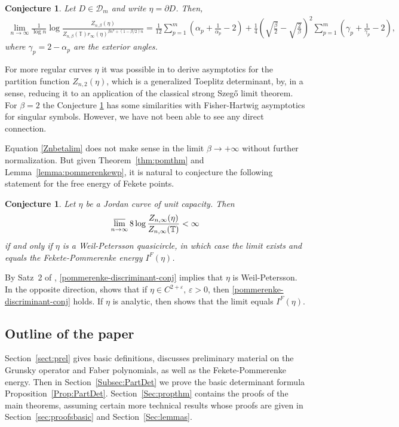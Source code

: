 \documentclass{article}
\numberwithin{equation}{section}
\numberwithin{figure}{section}
\theoremstyle{plain}
\theoremstyle{plain}
\numberwithin{thm}{section}
\newtheorem{conjecture}[thm]{Conjecture}
\theoremstyle{remark}
\newcommand{\T}{\mathbb{T}}
\let \epsilon \varepsilon
\begin{document}
\begin{conjecture}\label{Conj:Curvecorners}
Let $D \in \mathcal{D}_m$ and write $\eta = \partial D$. Then,
\begin{align}\label{Znbetaconj}
\lim_{n\to\infty}\frac 1{\log n}\log \frac{Z_{n,\beta}(\eta)}{Z_{n,\beta}(\T)r_\infty(\eta)^{\beta n^2+(1-\beta/2)n}}=\frac 1{12}\sum_{p=1}^m \left(\alpha_p+\frac 1{\alpha_p}-2 \right)+
\frac 14\left(\sqrt{\frac{\beta}{2}}-\sqrt{\frac{2}{\beta}}\right)^2\sum_{p=1}^m \left(\gamma_p+\frac 1{\gamma_p}-2 \right),
\end{align}
where  $\gamma_p  = 2-\alpha_p$ are the exterior angles.
\end{conjecture}
For more regular curves $\eta$ it was possible in \cite{Jo} to derive asymptotics for the partition function $Z_{n,2}(\eta)$, which is a generalized Toeplitz determinant, by, in a sense, reducing it to an application of the classical strong Szeg\H{o} limit theorem. For $\beta=2$ the Conjecture \ref{Conj:Curvecorners} has some
similarities with Fisher-Hartwig asymptotics for singular symbols. However, we have not been able to see any direct connection.

Equation \eqref{Znbetalim} does not make sense in the limit $\beta \to 
 +\infty$ without further normalization. But given Theorem~\ref{thm:pomthm} and Lemma~\ref{lemma:pommerenkewp}, it is natural to conjecture the following statement for the free energy of Fekete points.
\begin{conjecture}\label{Conj:discriminant}
Let $\eta$ be a Jordan curve of unit capacity. Then
\begin{align} \label{pommerenke-discriminant-conj}
\varlimsup_{n \to \infty} 8 \log \frac{Z_{n,\infty}(\eta)}{Z_{n,\infty}(\T)} < \infty
\end{align}
if and only if $\eta$ is a Weil-Petersson quasicircle, in which case the limit exists and equals the Fekete-Pommerenke energy $I^F(\eta)$. 
\end{conjecture}
 By Satz~2 of \cite{pom67}, \eqref{pommerenke-discriminant-conj} implies that $\eta$ is Weil-Petersson. In the opposite direction, \cite{pom65} shows that if  $\eta \in C^{2+\epsilon}, \, \epsilon >0$, then \eqref{pommerenke-discriminant-conj} holds. If $\eta$ is analytic, then \cite{pom69} shows that the limit equals $I^F(\eta)$. 




\subsection{Outline of the paper}
Section~\ref{sect:prel} gives basic definitions, discusses preliminary material on the Grunsky operator and Faber polynomials, as well as the Fekete-Pommerenke energy. Then in Section~\ref{Subsec:PartDet} we prove the basic determinant formula Proposition~\ref{Prop:PartDet}. Section~\ref{Sec:propthm} contains the proofs of the main theorems, assuming certain more technical results whose proofs are given in Section~\ref{sec:proofsbasic} and Section~\ref{Sec:lemmas}.
\end{document}
